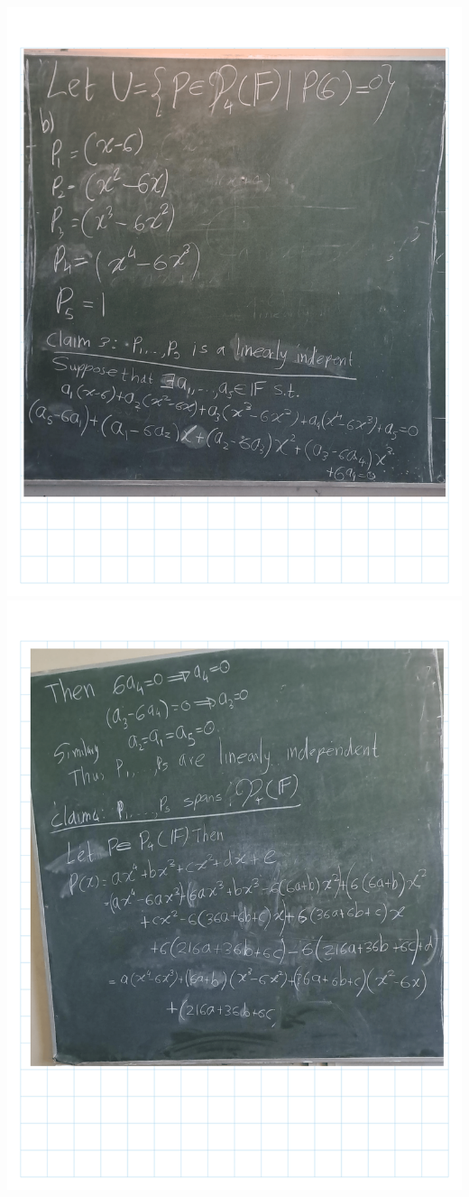 \documentclass[
]{book}
\theoremstyle{definition}
\theoremstyle{definition}
\theoremstyle{definition}
\theoremstyle{definition}
\theoremstyle{remark}
\begin{document}
\includegraphics{fig/Ex 2B and 2C/Ex 2c (10).png}
\includegraphics{fig/Ex 2B and 2C/Ex 2c (11).png}
\end{document}
